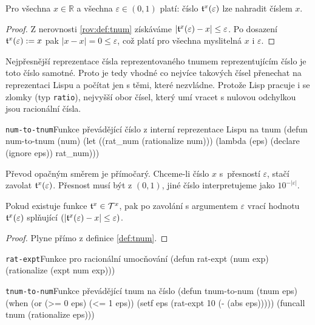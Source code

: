 \begin{lemma}\label{lem:num-to-tnum}
Pro všechna $x\in\mathbb{R}$ a všechna $\varepsilon \in (0,1)$ platí: číslo $\mathfrak{t}^{x}(\varepsilon)$ lze nahradit číslem $x$.
\begin{proof}
Z nerovnosti \ref{rov:def:tnum} získáváme $|\mathfrak{t}^{x}(\varepsilon) - x |\leq \varepsilon$. Po dosazení $\mathfrak{t}^{x}(\varepsilon) := x$ pak $|x - x | = 0 \leq \varepsilon$, což platí pro všechna myslitelná $x$ i $\varepsilon$.
\end{proof}
\end{lemma}

Nejpřesnější reprezentace čísla reprezentovaného tnumem reprezentujícím čí\-slo je toto číslo samotné. Proto je tedy vhodné co nejvíce takových čísel přenechat na reprezentaci Lispu a počítat jen s těmi, které nezvládne. Protože Lisp pracuje i se zlomky (typ \texttt{ratio}), nejvyšší obor čísel, který umí vracet s nulovou odchylkou jsou racionální čísla.

\begin{lispcode}{\texttt{num-to-tnum}}{Funkce převádějící číslo z interní reprezentace Lispu na tnum}
(\textcolor{funkcionalni}{defun} \textcolor{pojmenovan}{num-to-tnum} (num)
  (\textcolor{vedlejsi}{let} ((rat_num (\textcolor{matematicke}{rationalize} num)))
    (\textcolor{funkcionalni}{lambda} (eps) (\textcolor{vedlejsi}{declare} (\textcolor{vedlejsi}{ignore} eps))
      rat_num)))
\end{lispcode}

Převod opačným směrem je přímočarý. Chceme-li číslo $x$ s~přesností $\varepsilon$, stačí zavolat $\mathfrak{t}^{x}(\varepsilon)$. Přesnost musí být z $(0, 1)$, jiné číslo interpretujeme jako $10^{-|\varepsilon|}$.

\begin{lemma}
Pokud existuje funkce $\mathfrak{t}^{x}\in\mathcal{T}^{x}$, pak po zavolání s argumentem $\varepsilon$ vrací hodnotu $\mathfrak{t}^{x}(\varepsilon)$ splňující $(|\mathfrak{t}^{x}(\varepsilon) - x |\leq \varepsilon)$.
\begin{proof}
Plyne přímo z definice \ref{def:tnum}.
\end{proof}
\end{lemma}

\begin{lispcode}{\texttt{rat-expt}}{Funkce pro racionální umocňování}
(\textcolor{funkcionalni}{defun} \textcolor{pojmenovan}{rat-expt} (num exp)
  (\textcolor{matematicke}{rationalize} (\textcolor{matematicke}{expt} num exp)))
\end{lispcode}

\begin{lispcode}{\texttt{tnum-to-num}}{Funkce převádějící tnum na číslo}
(\textcolor{funkcionalni}{defun} \textcolor{pojmenovan}{tnum-to-num} (tnum eps)
  (\textcolor{funkcionalni}{when} (\textcolor{funkcionalni}{or} (\textcolor{matematicke}{>=} 0 eps) (\textcolor{matematicke}{<=} 1 eps))
    (\textcolor{vedlejsi}{setf} eps (\textcolor{moje}{rat-expt} 10 (\textcolor{matematicke}{-} (\textcolor{matematicke}{abs} eps)))))
  (\textcolor{funkcionalni}{funcall} tnum (\textcolor{matematicke}{rationalize} eps)))
\end{lispcode}

